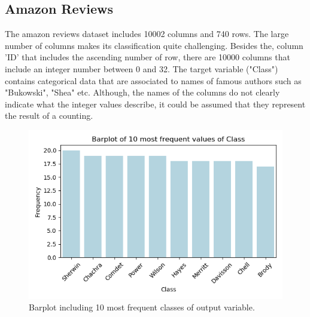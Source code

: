 \documentclass{article}
\begin{document}
\subsection{Amazon Reviews}
The amazon reviews dataset includes 10002 columns and 740 rows. The large number of columns makes its classification quite challenging. Besides the, column 'ID' that includes the ascending number of row, there are 10000 columns that include an integer number between 0 and 32. The target variable ("Class") contains categorical data that are associated to names of famous authors such as "Bukowski", "Shea" etc. Although, the names of the columns do not clearly indicate what the integer values describe, it could be assumed that they represent the result of a counting.
\begin{figure}[htp]

\centering
\includegraphics[width=.5\textwidth]{reviews_class.png}
\caption{Barplot including 10 most frequent classes of output variable.}
\label{fig:barplot_reviews}
\end{figure}
\end{document}

